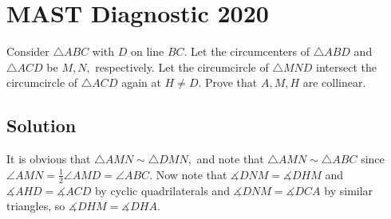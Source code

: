 \documentclass{article}
\begin{document}
\pagebreak\section{MAST Diagnostic 2020}

Consider $\triangle ABC$ with $D$ on line $BC.$ Let the circumcenters of $\triangle ABD$ and $\triangle ACD$ be $M,N,$ respectively. Let the circumcircle of $\triangle MND$ intersect the circumcircle of $\triangle ACD$ again at $H\neq D.$ Prove that $A,M,H$ are collinear.

\subsection{Solution}

It is obvious that $\triangle AMN\sim \triangle DMN,$ and note that $\triangle AMN\sim\triangle ABC$ since $\angle AMN=\frac{1}{2}\angle AMD=\angle ABC.$ Now note that $\measuredangle DNM=\measuredangle DHM$ and $\measuredangle AHD=\measuredangle ACD$ by cyclic quadrilaterals and $\measuredangle DNM=\measuredangle DCA$ by similar triangles, so $\measuredangle DHM=\measuredangle DHA.$
\end{document}
